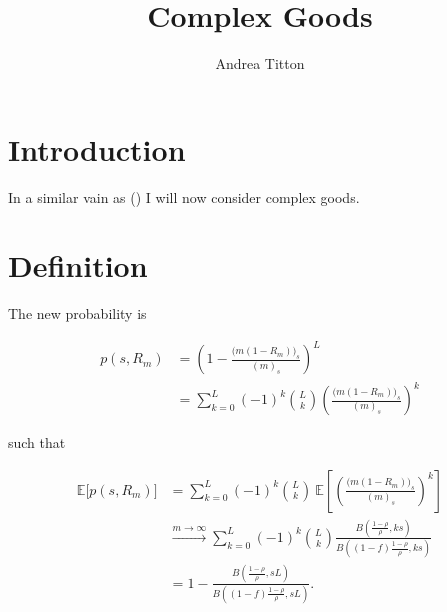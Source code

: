 \documentclass[american, abstract=on]{scrartcl}
\author{Andrea Titton}
\title{Complex Goods}
\theoremstyle{plain}
\newcommand{\E}{\mathbb{E}}
\newcommand{\citein}[1]{\citeauthor{#1} (\citeyear{#1})}
\begin{document}
\maketitle

\section{Introduction}

In a similar vain as \citein{elliott_supply_2022} I will now consider complex goods.

\section{Definition}

The new probability is 

\begin{equation}
    \begin{split}
        p(s, R_m) &= \left( 1 - \frac{\big(m (1 - R_m)\big)_s}{(m)_s} \right)^L \\
        &= \sum^L_{k = 0} (-1)^k \binom{L}{k} \left( \frac{\big(m (1 - R_m)\big)_s}{(m)_s} \right)^k
    \end{split}
\end{equation}

such that

\begin{equation}
    \begin{split}
        \E\big[p(s, R_m)\big] &= \sum^L_{k = 0} (-1)^k \binom{L}{k} \ \E\left[ \left( \frac{\big(m (1 - R_m)\big)_s}{(m)_s} \right)^k \right]  \\
        &\xrightarrow{m \rightarrow \infty} \sum^L_{k = 0} (-1)^k \binom{L}{k} \frac{B\left( \frac{1 - \rho}{\rho}, k s \right)}{B\left( (1 - f)\frac{1 - \rho}{\rho}, k s \right)} \\
        &= 1 - \frac{B\left( \frac{1 - \rho}{\rho}, s L \right)}{B\left( (1 - f)\frac{1 - \rho}{\rho}, s L \right)}.
    \end{split}
\end{equation}

\newpage
\printbibliography
\end{document}
